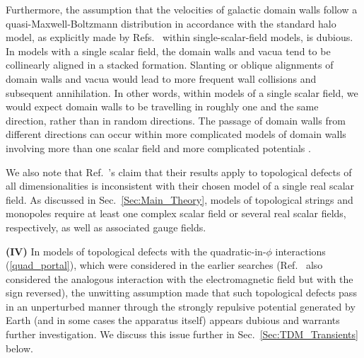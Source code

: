 \documentclass[aps,prd,onecolumn,nofootinbib]{revtex4-2} %
\begin{document}
Furthermore, the assumption that the velocities of galactic domain walls follow a quasi-Maxwell-Boltzmann distribution in accordance with the standard halo model, as explicitly made by Refs.~\cite{Roberts_2017_TDM-GPS,Roberts_2019_TDM-clocks} within single-scalar-field models, is dubious. 
In models with a single scalar field, the domain walls and vacua tend to be collinearly aligned in a stacked formation. 
Slanting or oblique alignments of domain walls and vacua would lead to more frequent wall collisions and subsequent annihilation. 
In other words, within models of a single scalar field, we would expect domain walls to be travelling in roughly one and the same direction, rather than in random directions. 
The passage of domain walls from different directions can occur within more complicated models of domain walls involving more than one scalar field and more complicated potentials \cite{Bazeia2002_DWs-review}. 

We also note that Ref.~\cite{Roberts_2019_TDM-clocks}'s claim that their results apply to topological defects of all dimensionalities is inconsistent with their chosen model of a single real scalar field. 
As discussed in Sec.~\ref{Sec:Main_Theory}, models of topological strings and monopoles require at least one complex scalar field or several real scalar fields, respectively, as well as associated gauge fields. 


\textbf{(IV)} In models of topological defects with the quadratic-in-$\phi$ interactions (\ref{quad_portal}), which were considered in the earlier searches \cite{Wcislo_2016_TDM-cavity,Roberts_2017_TDM-GPS,Wcislo_2018_TDM-cavity,Roberts_2019_TDM-clocks} (Ref.~\cite{Roberts_2019_TDM-clocks} also considered the analogous interaction with the electromagnetic field but with the sign reversed), the unwitting assumption made that such topological defects pass in an unperturbed manner through the strongly repulsive potential generated by Earth (and in some cases the apparatus itself) appears dubious and warrants further investigation. 
We discuss this issue further in Sec.~\ref{Sec:TDM_Transients} below. 
\end{document}
